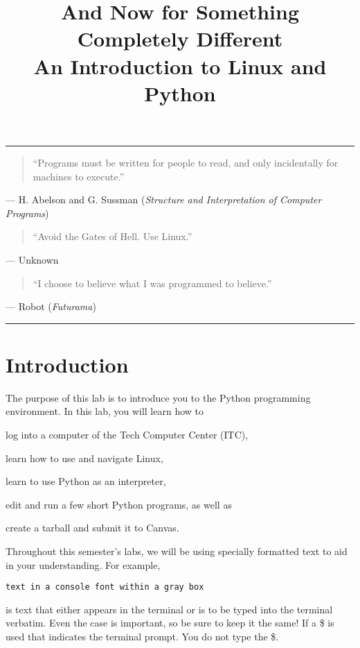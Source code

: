\documentclass[11pt]{cselabheader}
\title{And Now for Something Completely Different\\
  {\large An Introduction to Linux and Python}}
\begin{document}
\maketitle

\hrule

\begin{quotation}
  ``Programs must be written for people to read, and only incidentally for
  machines to execute.''
\end{quotation}
\begin{flushright}
--- H. Abelson and G. Sussman (\textit{Structure and Interpretation of Computer
Programs})
\end{flushright}

\begin{quotation}
``Avoid the Gates of Hell. Use Linux.''
\end{quotation}
\begin{flushright}
--- Unknown
\end{flushright}

\begin{quotation}
``I choose to believe what I was programmed to believe.''
\end{quotation}
\begin{flushright}
  --- Robot (\textit{Futurama})
\end{flushright}

\hrule
\section{Introduction}

The purpose of this lab is to introduce you to the Python programming
environment. In this lab, you will learn how to
\begin{enumerate*}
  \item log into a computer of the Tech Computer Center (ITC),
  \item learn how to use and navigate Linux,
  \item learn to use Python as an interpreter,
  \item edit and run a few short Python programs, as well as
  \item create a tarball and submit it to Canvas.
\end{enumerate*}

Throughout this semester's labs, we will be using specially formatted text to
aid in your understanding. For example,
\begin{lstlisting}[style=bash]
text in a console font within a gray box
\end{lstlisting}
is text that either appears in the terminal or is to be typed into the terminal
verbatim. Even the case is important, so be sure to keep it the same! If a \$ is
used that indicates the terminal prompt. You do not type the \$.
\end{document}
